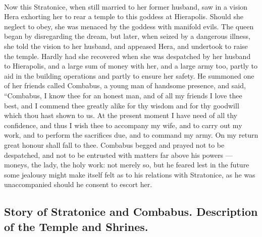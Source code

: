 \documentclass[a4paper, 11pt, oneside, polutonikogreek, english]{article}
\begin{document}
\paragraph{}
Now this Stratonice, when still married to her former husband, saw in a vision Hera exhorting her to rear a temple to this goddess at Hierapolis. Should she neglect to obey, she was menaced by the goddess with manifold evils. The queen began by disregarding the dream, but later, when seized by a dangerous illness, she told the vision to her husband, and appeased Hera, and undertook to raise the temple. Hardly had she recovered when she was despatched by her husband to Hierapolis, and a large sum of money with her, and a large army too, partly to aid in the building operations and partly to ensure her safety. He summoned one of her friends called Combabus, a young man of handsome presence, and said, ``Combabus, I know thee for an honest man, and of all my friends I love thee best, and I commend thee greatly alike for thy wisdom and for thy goodwill which thou hast shown to us. At the present moment I have need of all thy confidence, and thus I wish thee to accompany my wife, and to carry out my work, and to perform the sacrifices due, and to command my army. On my return great honour shall fall to thee. Combabus begged and prayed not to be despatched, and not to be entrusted with matters far above his powers --- moneys, the lady, the holy work: not merely so, but he feared lest in the future some jealousy might make itself felt as to his relations with Stratonice, as he was unaccompanied should he consent to escort her.

\subsection{Story of Stratonice and Combabus. Description of the Temple and Shrines.}
\end{document}
